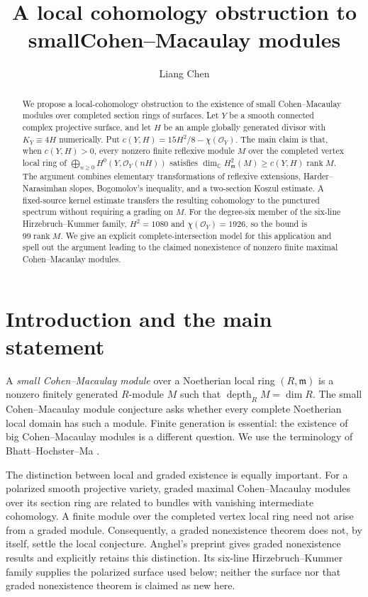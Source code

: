 \documentclass[11pt,reqno]{amsart}
\title[An obstruction to small Cohen--Macaulay modules]{A local cohomology obstruction to small\newline Cohen--Macaulay modules}
\author[Liang Chen]{Liang Chen}
\numberwithin{equation}{section}
\theoremstyle{definition}
\theoremstyle{remark}
\newcommand{\C}{\mathbb C}
\newcommand{\OO}{\mathcal O}
\newcommand{\mm}{\mathfrak m}
\newcommand{\rk}{\operatorname{rank}}
\newcommand{\depth}{\operatorname{depth}}
\begin{document}
\begin{abstract}
We propose a local-cohomology obstruction to the existence of small
Cohen--Macaulay modules over completed section rings of surfaces.
Let $Y$ be a smooth connected complex projective surface, and let $H$ be an
ample globally generated divisor with $K_Y\equiv4H$ numerically. Put
$c(Y,H)=15H^2/8-\chi(\OO_Y)$. The main claim is that, when
$c(Y,H)>0$, every nonzero finite reflexive module $M$ over the completed
vertex local ring of $\bigoplus_{n\geq0}H^0(Y,\OO_Y(nH))$ satisfies
$\dim_\C H^2_\mm(M)\geq c(Y,H)\rk M$.
The argument combines elementary transformations of reflexive extensions,
Harder--Narasimhan slopes, Bogomolov's inequality, and a two-section
Koszul estimate. A fixed-source kernel estimate transfers the resulting
cohomology to the punctured spectrum without requiring a grading on $M$.
For the degree-six member of the six-line Hirzebruch--Kummer family,
$H^2=1080$ and $\chi(\OO_Y)=1926$, so the bound is $99\rk M$.
We give an explicit complete-intersection model for this application and
spell out the argument leading to the claimed nonexistence of nonzero
finite maximal Cohen--Macaulay modules.
\end{abstract}
\maketitle

\section{Introduction and the main statement}\label{sec:introduction}

A \emph{small Cohen--Macaulay module} over a Noetherian local ring
$(R,\mm)$ is a nonzero finitely generated $R$-module $M$ such that
$\depth_R M=\dim R$. The small Cohen--Macaulay module conjecture asks
whether every complete Noetherian local domain has such a module.
Finite generation is essential: the existence of big Cohen--Macaulay
modules is a different question. We use the terminology of
Bhatt--Hochster--Ma \cite[Section 1.3]{BHM2026}.

The distinction between local and graded existence is equally important.
For a polarized smooth projective variety, graded maximal Cohen--Macaulay
modules over its section ring are related to bundles with vanishing
intermediate cohomology. A finite module over the completed vertex local
ring need not arise from a graded module. Consequently, a graded
nonexistence theorem does not, by itself, settle the local conjecture.
Anghel's preprint \cite{Anghel2026} gives graded nonexistence results and
explicitly retains this distinction. Its six-line Hirzebruch--Kummer
family supplies the polarized surface used below; neither the surface
nor that graded nonexistence theorem is claimed as new here.
\end{document}
